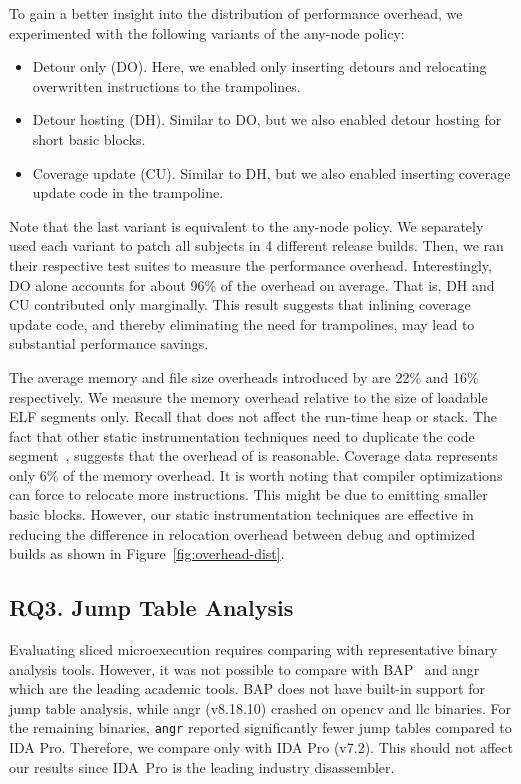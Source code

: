 To gain a better insight into the distribution of performance overhead, we experimented with the following variants of the any-node policy:

\begin{itemize}
	\item Detour only (DO). Here, we enabled only inserting detours and relocating overwritten instructions to the trampolines.
	\item Detour hosting (DH). Similar to DO, but we also enabled detour hosting for short basic blocks.
	\item Coverage update (CU). Similar to DH, but we also enabled inserting coverage update code in the trampoline. 
\end{itemize}

Note that the last variant is equivalent to the any-node policy.
We separately used each variant to patch all subjects in 4 different release builds.
Then, we ran their respective test suites to measure the performance overhead.
Interestingly, DO alone accounts for about 96\% of the overhead on average.
That is, DH and CU contributed only marginally.
This result suggests that inlining coverage update code, and thereby eliminating the need for trampolines,  may lead to substantial performance savings.

  
The average memory and file size overheads introduced by {\bcov} are 22\% and 16\% respectively.
We measure the memory overhead relative to the size of loadable ELF segments only. 
Recall that {\bcov} does not affect the run-time heap or stack.
The fact that other static instrumentation techniques need to duplicate the code segment~\cite{Anand:EuroSys2013,Laurenzano2010}, suggests that the overhead of {\bcov} is reasonable.
Coverage data represents only 6\% of the memory overhead.
It is worth noting that compiler optimizations can force {\bcov} to relocate more instructions.
This might be due to emitting smaller basic blocks.
However, our static instrumentation techniques are effective in reducing the difference in relocation overhead between debug and optimized builds as shown in Figure~\ref{fig:overhead-dist}.


\subsection*{RQ3. Jump Table Analysis}
Evaluating sliced microexecution requires comparing {\bcov} with representative binary analysis tools.
However, it was not possible to compare with BAP~\cite{BAP:CAV2011Brumley} and \textsf{angr}~\cite{angr:Shoshitaishvili2016} which are the leading academic tools.
BAP does not have built-in support for jump table analysis, while \textsf{angr} (v8.18.10) crashed on \textsf{opencv} and \textsf{llc} binaries.
For the remaining binaries, \texttt{angr} reported significantly fewer jump tables compared to IDA Pro.
Therefore, we compare {\bcov} only with IDA Pro (v7.2).
This should not affect our results since IDA~Pro is the leading industry disassembler.

